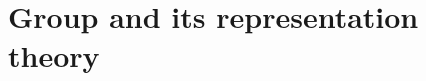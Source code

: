 \documentclass[a4paper,pdftex,10pt]{article}
\begin{document}
\maketitle

\tableofcontents

\clearpage
\section{Group and its representation theory}












\clearpage



\nocite{Peskin:1995}
\nocite{Nair:2005}
\nocite{Weinberg:1996kr}
\nocite{Weinberg:1995mt}
\nocite{Weinberg:2000}

\end{document}
